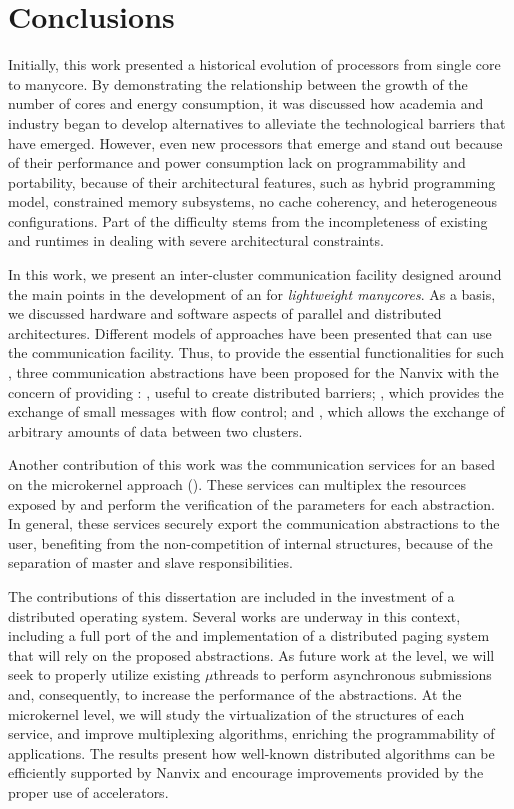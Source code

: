 \chapter{Conclusions}
\label{ch.conclusions}

	Initially, this work presented a historical evolution of processors from single core
    to manycore. By demonstrating the relationship between the growth of the
    number of cores and energy consumption, it was discussed how academia and
    industry began to develop alternatives to alleviate the technological barriers
    that have emerged. However, even new processors that emerge and stand out
    because of their performance and power consumption lack on programmability
    and portability, because of their architectural features, such as hybrid
    programming model, constrained memory subsystems, no cache coherency, and
    heterogeneous configurations. Part of the difficulty stems from the
    incompleteness of existing \oss and runtimes in dealing with severe
    architectural constraints.

	In this work, we present an inter-cluster communication facility designed
    around the main points in the development of an \os for
    \textit{lightweight manycores}. As a basis, we discussed hardware and software
    aspects of parallel and distributed architectures. Different models of \os
    approaches have been presented that can use the communication facility.
    Thus, to provide the essential functionalities for such \oss, three
    communication abstractions have been proposed for the Nanvix \hal with the concern of
    providing \qos: \sync, useful to create distributed
    barriers; \mailbox, which provides the exchange of small messages
    with flow control; and \portal, which allows the exchange
    of arbitrary amounts of data between two clusters.

	Another contribution of this work was the communication services for an \os
    based on the microkernel approach (\nanvix). These services can multiplex
    the resources exposed by \hal and perform the verification of the parameters for
    each abstraction. In general, these services securely export the communication
    abstractions to the user, benefiting from the non-competition of \os internal
    structures, because of the separation of master and slave responsibilities.

	The contributions of this dissertation are included in the investment of a
    distributed operating system. Several works are underway in this context,
    including a full port of the \mpi and implementation of a distributed paging
    system that will rely on the proposed abstractions. As future work at the \hal level, we will
    seek to properly utilize existing \dma $\mu$threads to perform asynchronous
    submissions and, consequently, to increase the performance of the abstractions. At
    the microkernel level, we will study the virtualization of the structures of
    each service, and improve multiplexing algorithms, enriching the
    programmability of applications. The results present how well-known
    distributed algorithms can be efficiently supported by Nanvix \os and
    encourage improvements provided by the proper use of \dma accelerators.